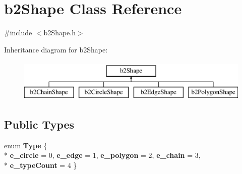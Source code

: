 \hypertarget{classb2_shape}{\section{b2\-Shape Class Reference}
\label{classb2_shape}
}


{\ttfamily \#include $<$b2\-Shape.\-h$>$}

Inheritance diagram for b2\-Shape\-:\begin{figure}[H]
\begin{center}
\leavevmode
\includegraphics[height=2.000000cm]{classb2_shape}
\end{center}
\end{figure}
\subsection*{Public Types}
\begin{DoxyCompactItemize}
\item 
enum {\bfseries Type} \{ \\*
{\bfseries e\-\_\-circle} =  0, 
{\bfseries e\-\_\-edge} =  1, 
{\bfseries e\-\_\-polygon} =  2, 
{\bfseries e\-\_\-chain} =  3, 
\\*
{\bfseries e\-\_\-type\-Count} =  4
 \}
\end{DoxyCompactItemize}
